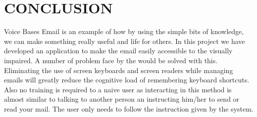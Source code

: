 \documentclass[12pt]{article}
\begin{document}
\section{CONCLUSION}
Voice Bases Email is an example of how by using the simple bits of knowledge, we can make something really useful and life for others.  In this project we have developed an application to make the email easily accessible to the visually impaired. A number of problem face by the would be solved with this. Eliminating the use of screen keyboards and screen readers while managing emails will greatly reduce the cognitive load of remembering keyboard shortcuts. Also no training is required to a naive user as interacting in this method is almost similar to talking to another person an instructing him/her to send or read your mail. The user only needs to follow the instruction given by the system. 
\end{document}
